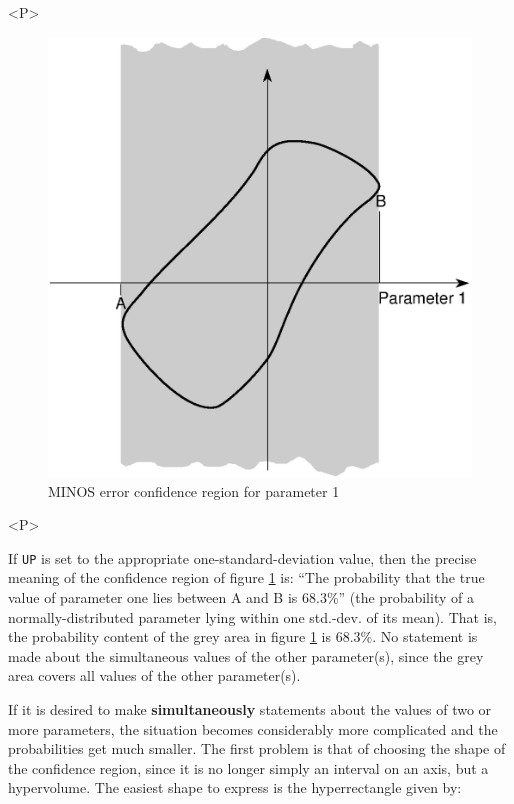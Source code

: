 \begin{htmlonly}
\begin{rawhtml}<P>\end{rawhtml}
\begin{figure}
\begin{makeimage}
\includegraphics[width=\linewidth]{minosco1.eps}
\end{makeimage}
\caption{MINOS error confidence region for parameter 1}
\label{fig:MINosconf1}
\end{figure}
\begin{rawhtml}<P>\end{rawhtml}
\end{htmlonly}
 
If \texttt{UP} is set to the appropriate one-standard-deviation value, 
then the precise meaning of the confidence region of figure 
\ref{fig:MINosconf1} is:  ``The probability 
that the true value of parameter one lies between A and B is 68.3\%''
(the probability of a normally-distributed parameter lying within 
one std.-dev. of its mean). 
That is, the probability content of the 
grey area in figure \ref{fig:MINosconf1} is 68.3\%. 
No statement is made about 
the simultaneous values of the other parameter(s), since the grey
area covers all values of the other parameter(s).
 
If it is desired to make {\bf simultaneously} statements about the values 
of two or more parameters, the situation becomes considerably more 
complicated and the probabilities get much smaller. 
The first problem is 
that of choosing the shape of the confidence region, since it is no 
longer simply an interval on an axis, but a hypervolume. The easiest 
shape to express is the hyperrectangle given by: 

